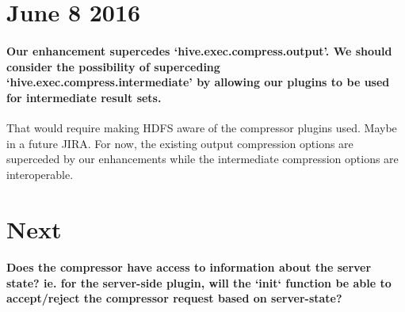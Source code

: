 \documentclass[11pt,a4paper]{article}
\begin{document}
\section*{June 8 2016}

	\paragraph{Our enhancement supercedes `hive.exec.compress.output'. We should consider the possibility of superceding `hive.exec.compress.intermediate' by allowing our plugins to be used for intermediate result sets.}
	That would require making HDFS aware of the compressor plugins used. Maybe in a future JIRA. For now, the existing output compression options are superceded by our enhancements while the intermediate compression options are interoperable. 

\section*{Next}
	
	\paragraph{Does the compressor have access to information about the server state? ie. for the server-side plugin, will the `init` function be able to accept/reject the compressor request based on server-state?}
	
\end{document}

